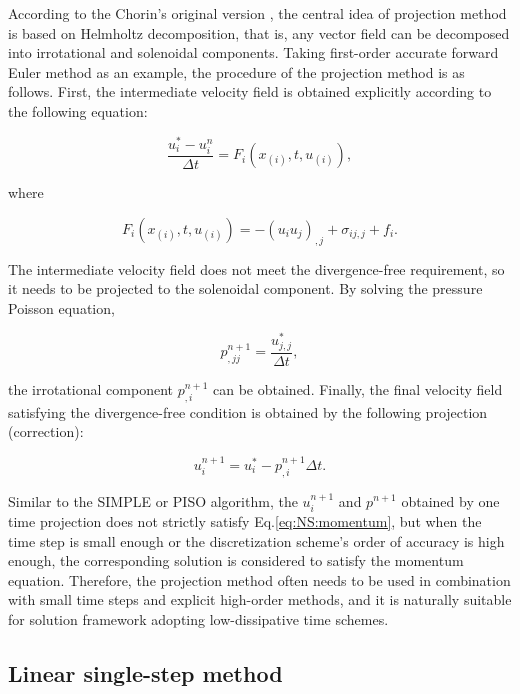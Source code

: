 \documentclass{article}
\begin{document}
According to the Chorin's original version \citep{Chorin:1967,Chorin:1968}, the central idea of projection method is based on Helmholtz decomposition, that is, any vector field can be decomposed into irrotational and solenoidal components. Taking first-order accurate forward Euler method as an example, the procedure of the projection method is as follows. First, the intermediate velocity field is obtained explicitly according to the following equation:

\begin{equation}
\label{eq:predict}
  \frac{u_i^{*} - u_i^{n}}{\Delta t} = F_i \left( x_{(i)}, t, u_{(i)} \right),
\end{equation}

where

\begin{equation}
  F_i \left( x_{(i)}, t, u_{(i)} \right) = -(u_i u_j)_{,j} + \sigma_{ij,j} + f_i.
\end{equation}

The intermediate velocity field does not meet the divergence-free requirement, so it needs to be projected to the solenoidal component. By solving the pressure Poisson equation,

\begin{equation}
\label{eq:poisson}
  p_{,jj}^{n+1} = \frac{u_{j,j}^{*}}{\Delta t},
\end{equation}

the irrotational component $p_{,i}^{n+1}$ can be obtained. Finally, the final velocity field satisfying the divergence-free condition is obtained by the following projection (correction):

\begin{equation}
  u_i^{n+1} = u_i^{*} - p_{,i}^{n+1} \Delta t.
\end{equation}

Similar to the SIMPLE or PISO algorithm, the $u_i^{n+1}$ and $p^{n+1}$ obtained by one time projection does not strictly satisfy Eq.\eqref{eq:NS:momentum}, but when the time step is small enough or the discretization scheme's order of accuracy is high enough, the corresponding solution is considered to satisfy the momentum equation. Therefore, the projection method often needs to be used in combination with small time steps and explicit high-order methods, and it is naturally suitable for solution framework adopting low-dissipative time schemes.


\subsection{Linear single-step method}
\label{ssec:single}
\end{document}
